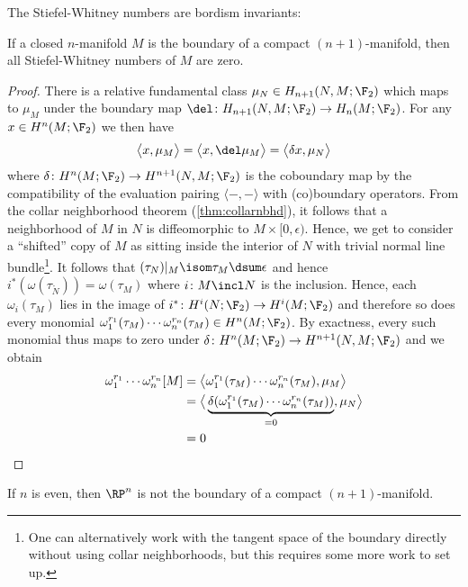 The Stiefel-Whitney numbers are bordism invariants:
\begin{theorem}
	If a closed $n$-manifold $M$ is the boundary of a compact $(n + 1)$-manifold, then all Stiefel-Whitney numbers of $M$ are zero.
\end{theorem}
\begin{proof}
	There is a relative fundamental class $\mu_N \in H_{n + 1}(N, M; \F_2)$ which maps to $\mu_M$ under the boundary map $\del\colon H_{n + 1}(N, M; \F_2) \to H_n(M; \F_2)$.
	For any $x \in H^n(M; \F_2)$ we then have
	\begin{equation*}
		\big\langle x, \mu_M \big\rangle = \big\langle x, \del \mu_M \big\rangle = \big\langle \delta x, \mu_N \big\rangle
	\end{equation*}
	where $\delta\colon H^n(M; \F_2) \to H^{n + 1}(N, M; \F_2)$ is the coboundary map by the compatibility of the evaluation pairing $\langle {{-}}, {{-}} \rangle$ with (co)boundary operators.
	From the collar neighborhood theorem (\ref{thm:collarnbhd}), it follows that a neighborhood of $M$ in $N$ is diffeomorphic to $M \times [0, \epsilon)$.
	Hence, we get to consider a \enquote{shifted} copy of $M$ as sitting inside the interior of $N$ with trivial normal line bundle\footnote{One can alternatively work with the tangent space of the boundary directly without using collar neighborhoods, but this requires some more work to set up.}.
	It follows that $(\tau_N)|_M \isom \tau_M \dsum \epsilon$ and hence $i^*(\omega(\tau_{\mathring{N}})) = \omega(\tau_M)$ where $i\colon M \incl N$ is the inclusion.
	Hence, each $\omega_i(\tau_M)$ lies in the image of $i^*\colon H^i(N; \F_2) \to H^i(M; \F_2)$ and therefore so does every monomial $\omega_1^{r_1}(\tau_M) \cdots \omega_n^{r_n}(\tau_M) \in H^n(M; \F_2)$.
	By exactness, every such monomial thus maps to zero under $\delta\colon H^n(M; \F_2) \to H^{n + 1}(N, M; \F_2)$ and we obtain
	\begin{align*}
		\omega_1^{r_1} \cdots \omega_n^{r_n}[M] &= \big\langle \omega_1^{r_1}(\tau_M) \cdots \omega_n^{r_n}(\tau_M), \mu_M \big\rangle \\ 
												&= \big\langle \underbrace{\delta(\omega_1^{r_1}(\tau_M) \cdots \omega_n^{r_n}(\tau_M))}_{= 0}, \mu_N \big\rangle \\
												&= 0 
												\qedhere
	\end{align*}
\end{proof}
\begin{corollary}
	If $n$ is even, then $\RP^n$ is not the boundary of a compact $(n + 1)$-manifold.
\end{corollary}
